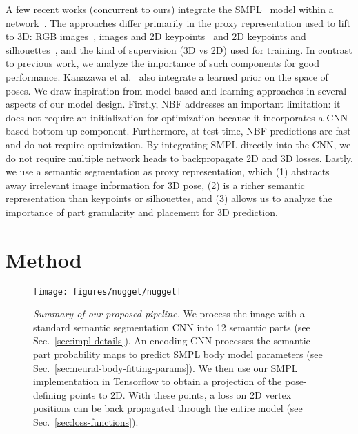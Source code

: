 \documentclass[10pt,twocolumn,letterpaper]{article}
\begin{document}
A few recent works (concurrent to ours) integrate the SMPL~\cite{smpl2015loper} model within a network~\cite{tung2017self,hmrKanazawa17,pavlakos2018humanshape}. 
The approaches differ primarily in the proxy representation used to lift to 3D: 
RGB images~\cite{hmrKanazawa17}, images and 2D keypoints~\cite{tung2017self} and 2D keypoints and silhouettes~\cite{pavlakos2018humanshape}, 
and the kind of supervision (3D vs 2D) used for training. 
In contrast to previous work, we analyze the importance of such components for good performance. Kanazawa et al.~\cite{hmrKanazawa17} also integrate a learned prior on the space of poses.
We draw inspiration from model-based and learning approaches in several aspects of our model design. 
Firstly, NBF addresses an important limitation: it does not require an initialization for optimization because it incorporates a CNN based bottom-up component. 
Furthermore, at test time, NBF predictions are fast and do not require optimization. 
By integrating SMPL directly into the CNN, we do not require multiple network heads to backpropagate 2D and 3D losses. 
Lastly, we use a semantic segmentation as proxy representation, which (1) abstracts away irrelevant image information for 3D pose, (2) is a richer semantic representation than keypoints or silhouettes, and (3) allows us to analyze the importance of part granularity and placement for 3D prediction.


 \section{Method}

\begin{figure*}

  \texttt{[image: figures/nugget/nugget]}
  \vspace*{-.8cm}
  \caption{\textit{Summary of our proposed pipeline.} We process the image with a standard semantic segmentation CNN into 12 semantic parts (see Sec.~\ref{sec:impl-details}). An encoding CNN processes the semantic part probability maps to predict SMPL body model parameters (see Sec.~\ref{sec:neural-body-fitting-params}). We then use our SMPL implementation in Tensorflow to obtain a projection of the pose-defining points to 2D. With these points, a loss on 2D vertex positions can be back propagated through the entire model (see Sec.~\ref{sec:loss-functions}).}
  \label{fig:summary}

\end{figure*}
\end{document}
